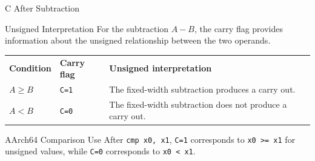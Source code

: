 \documentclass[aspectratio=169,11pt,t]{beamer}
\newcommand{\code}[1]{\texttt{#1}}
\begin{document}
\begin{frame}{C After Subtraction}
\begin{block}{Unsigned Interpretation}
For the subtraction $A-B$, the carry flag provides information about the unsigned relationship between the two operands.
\end{block}
\vspace{0.18cm}
\begin{center}
\small
\renewcommand{\arraystretch}{1.18}
\begin{tabular}{
>{\raggedright\arraybackslash}m{2.4cm}
>{\raggedright\arraybackslash}m{3.2cm}
>{\raggedright\arraybackslash}m{4.8cm}
}
\rowcolor{navy}
{\color{white}\bfseries Condition} &
{\color{white}\bfseries Carry flag} &
{\color{white}\bfseries Unsigned interpretation} \\
\rowcolor{softgray}
$A\ge B$ &
\code{C=1} &
The fixed-width subtraction produces a carry out. \\
\rowcolor{white}
$A<B$ &
\code{C=0} &
The fixed-width subtraction does not produce a carry out. \\
\end{tabular}
\end{center}
\vspace{0.2cm}
\begin{block}{AArch64 Comparison Use}
After \code{cmp x0, x1}, \code{C=1} corresponds to \code{x0 >= x1} for unsigned values, while \code{C=0} corresponds to \code{x0 < x1}.
\end{block}
\end{frame}










\end{document}
